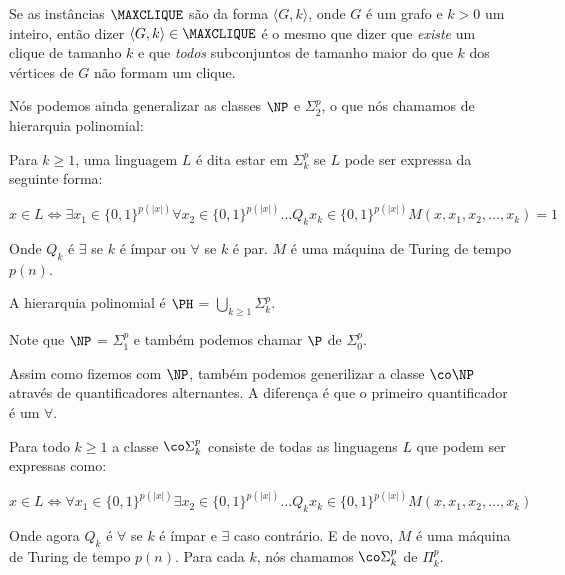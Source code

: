 Se as instâncias $\MAXCLIQUE$ são da forma $\langle G, k \rangle$, onde $G$ é um grafo e $k > 0$ um inteiro, então dizer $\langle G, k \rangle \in \MAXCLIQUE$ é o mesmo que dizer que \emph{existe} um clique de tamanho $k$ e que \emph{todos} subconjuntos de tamanho maior do que $k$ dos vértices de $G$ não formam um clique.

Nós podemos ainda generalizar as classes $\NP$ e $\Sigma_{2}^{p}$, o que nós chamamos de hierarquia polinomial:

\begin{defi}  \label{defi: PH}

Para $k \geq 1$, uma linguagem $L$ é dita estar em $\Sigma_{k}^{p}$ se $L$ pode ser expressa da seguinte forma:

\begin{equation*}
    x \in L \iff \exists x_{1} \in \{0, 1\}^{p(\lvert x \rvert)} \forall x_{2} \in \{0, 1\}^{p(\lvert x \rvert)} \dots Q_{k} x_{k} \in \{0, 1\}^{p(\lvert x \rvert)} M(x, x_{1}, x_{2}, \dots, x_{k}) = 1
\end{equation*}

Onde $Q_{k}$ é $\exists$ se $k$ é ímpar ou $\forall$ se $k$ é par. $M$ é uma máquina de Turing de tempo $p(n)$.

A hierarquia polinomial é $\PH$ = $\bigcup_{k \geq 1} \Sigma_{k}^{p}$.

\end{defi}

Note que $\NP$ = $\Sigma_{1}^{p}$ e também podemos chamar $\P$ de $\Sigma_{0}^{p}$.

Assim como fizemos com $\NP$, também podemos generilizar a classe $\co\NP$ através de quantificadores alternantes. A diferença é que o primeiro quantificador é um $\forall$.

\begin{defi}

Para todo $k \geq 1$ a classe $\co\Sigma_{k}^{p}$ consiste de todas as linguagens $L$ que podem ser expressas como:

\begin{equation*}
    x \in L \iff \forall x_{1} \in \{0, 1\}^{p(\lvert x \rvert)} \exists x_{2} \in \{0, 1\}^{p(\lvert x \rvert)} \dots Q_{k} x_{k} \in \{0, 1\}^{p(\lvert x \rvert)} M(x, x_{1}, x_{2}, \dots, x_{k})
\end{equation*}

Onde agora $Q_{k}$ é $\forall$ se $k$ é ímpar e $\exists$ caso contrário. E de novo, $M$ é uma máquina de Turing de tempo $p(n)$. Para cada $k$, nós chamamos $\co\Sigma_{k}^{p}$ de $\Pi_{k}^{p}$.

\end{defi}

